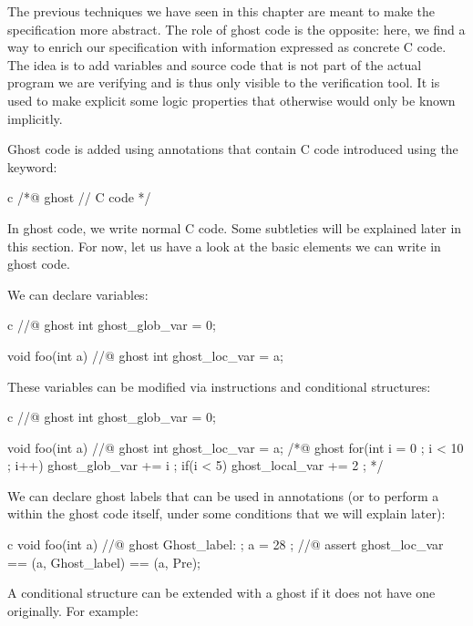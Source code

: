 
The previous techniques we have seen in this chapter are meant to make the
specification more abstract. The role of ghost code is the opposite: here, we
find a way to enrich our specification with information expressed as
concrete C code. The idea is to add variables and source code that is not part
of the actual program we are verifying and is thus only visible to the verification
tool. It is used to make explicit some logic properties that otherwise would only
be known implicitly.




Ghost code is added using annotations that contain C code
introduced using the  keyword:


\begin{CodeBlock}{c}
/*@
  ghost
  // C code
*/
\end{CodeBlock}


In ghost code, we write normal C code. Some subtleties will be explained
later in this section. For now, let us have a look at the basic elements
we can write in ghost code.


We can declare variables:


\begin{CodeBlock}{c}
//@ ghost int ghost_glob_var = 0;

void foo(int a){
  //@ ghost int ghost_loc_var = a;
}
\end{CodeBlock}


These variables can be modified via instructions and conditional structures:


\begin{CodeBlock}{c}
//@ ghost int ghost_glob_var = 0;

void foo(int a){
  //@ ghost int ghost_loc_var = a;
  /*@ ghost
    for(int i = 0 ; i < 10 ; i++){
      ghost_glob_var += i ;
      if(i < 5) ghost_local_var += 2 ;
    }
  */
}
\end{CodeBlock}


We can declare ghost labels that can be used in annotations (or to perform
a  within the ghost code itself, under some conditions that
we will explain later):


\begin{CodeBlock}{c}
void foo(int a){
  //@ ghost Ghost_label: ;
  a = 28 ;
  //@ assert ghost_loc_var == \at(a, Ghost_label) == \at(a, Pre);
}
\end{CodeBlock}


A conditional structure  can be extended with a ghost
 if it does not have one originally. For example:


